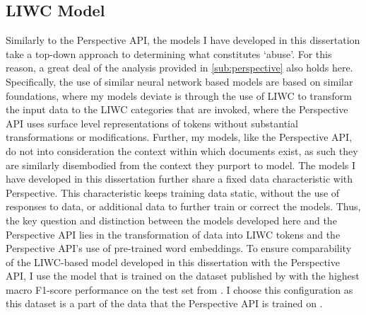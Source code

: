\subsection{LIWC Model}\label{sub:liwc_model}

Similarly to the Perspective API, the models I have developed in this dissertation take a top-down approach to determining what constitutes `abuse'. For this reason, a great deal of the analysis provided in \autoref{sub:perspective} also holds here. Specifically, the use of similar neural network based models are based on similar foundations, where my models deviate is through the use of LIWC \cite{Tausczik:2010} to transform the input data to the LIWC categories that are invoked, where the Perspective API uses surface level representations of tokens without substantial transformations or modifications. Further, my models, like the Perspective API, do not into consideration the context within which documents exist, as such they are similarly disembodied from the context they purport to model. The models I have developed in this dissertation further share a fixed data characteristic with Perspective. This characteristic keeps training data static, without the use of responses to data, or additional data to further train or correct the models. Thus, the key question and distinction between the models developed here and the Perspective API lies in the transformation of data into LIWC tokens and the Perspective API's use of pre-trained word embeddings. To ensure comparability of the LIWC-based model developed in this dissertation with the Perspective API, I use the model that is trained on the dataset published by \citet{Wulczyn:2017} with the highest macro F1-score performance on the test set from \citet{Wulczyn:2017}. I choose this configuration as this dataset is a part of the data that the Perspective API is trained on \citep{Perspective:Github}.\vspace{5mm}


